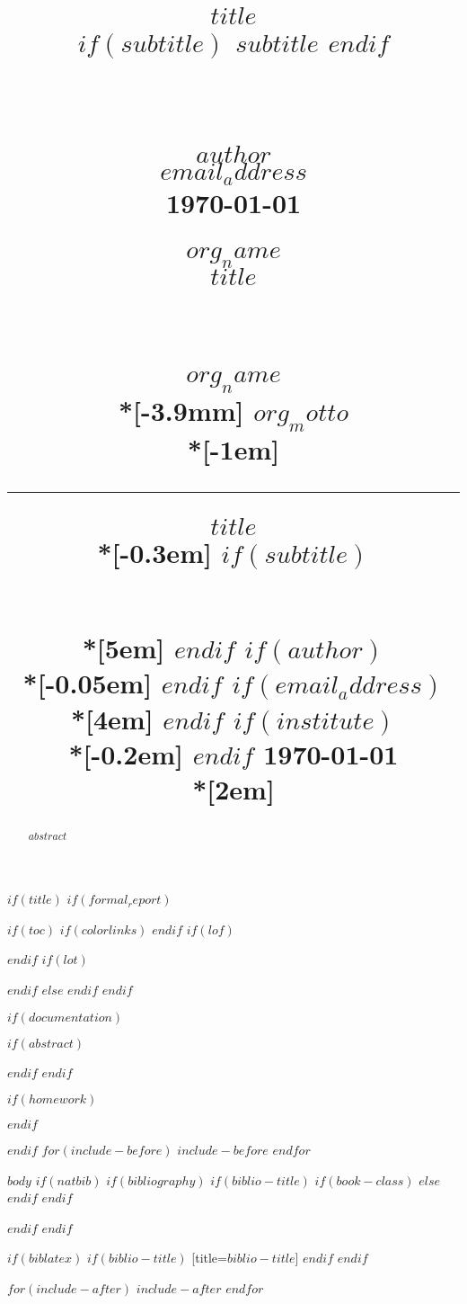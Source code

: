 \documentclass[$if(fontsize)$$fontsize$,$endif$$if(lang)$$babel-lang$,$endif$$if(papersize)$$papersize$paper,$endif$$for(classoption)$$classoption$$sep$,$endfor$]{$documentclass$}
\title{
    \normalsize
    \begin{flushright}
        \vspace{-7mm}
        \fontsize{22pt}{22pt} \color{black} \textbf{$title$} \\
        \vspace{0.3em}
        $if(subtitle)$
        \fontsize{20pt}{20pt}\color{$subtlecolor$} \textbf{$subtitle$}
        $endif$
        \vspace{-0.5em}
    \end{flushright}
    \horrule{0.4pt} \\[-0.5em]
}
\date{\vspace{-8mm}}
\title{
    \normalsize
    \begin{flushright}
        \vspace{-3em}
        \large \textbf{\textsf{$author$}} \\
        \vspace{-0.03em}
        \normalsize \textbf{\textsf{\color{$maincolor$}$email_address$}} \\
        \vspace{-0.05em}
        \textsf{\today} \\
        \vspace{1.15em}
    \end{flushright}
    \vspace{-6.0em}
    \begin{flushleft}
        \Huge \textbf{\textsf{\color{$maincolor$}$org_name$} }\\ %
        \vspace{0.07em}
        \Large \textbf{\textsf{\color{$if(grayscale)$$othercolorbw$$else$$othercolor$$endif$}$title$}} \\
        \vspace{-0.3em}
    \end{flushleft}
    \horrule{0.2pt} \\[0.5em] %
}
\date{\vspace{-4em}}
\title{
    \begin{flushright}
        \sffamily
        \vspace*{0em}
        \noindent
        \hspace{-0.40em}\YUGE 	\bfseries	\color{$if(grayscale)$$othercolorbw$$else$$othercolor$$endif$} \textbf{$org_name$} \\*[-3.9mm]
        \Yuge 		\color{black} \textbf{$org_motto$}   \\*[-1em]
        \color{black}		\hrule 		 	\vspace   	{10em}
    \end{flushright}
    \begin{flushleft}
        \sffamily
        \Subtitle  	\color{$maincolor$} \textbf{$title$}		\\*[-0.3em]
        $if(subtitle)$
        \hspace{-0.65em} \subtitle	\color{$if(grayscale)$$othercolorbw$$else$$othercolor$$endif$} \text{ $subtitle$} 	\\*[5em]
        $endif$
        $if(author)$
        \Huge	\color{black} \text{$author$}		\\*[-0.05em]
        $endif$
        $if(email_address)$
        \LARGE	\color{$if(grayscale)$$othercolorbw$$else$$othercolor$$endif$} \text{$email_address$}	\\*[4em]
        $endif$
        $if(institute)$
        \Large	\color{black}	\text{$institute$} 	\\*[-0.2em]
        $endif$
        \Large		\color{$if(grayscale)$$othercolorbw$$else$$othercolor$$endif$}			\today				\\*[2em]
    \end{flushleft}
    }
\date{\vspace{1mm}}
\begin{document}
$if(title)$
$if(formal_report)$
\thispagestyle{title}
\maketitle
{} \vspace{-20mm}
$if(toc)$	{
$if(colorlinks)$
\hypersetup{linkcolor=$if(toccolor)$$toccolor$$else$black$endif$}
$endif$
\setcounter{tocdepth}{$toc-depth$}
\tableofcontents \vspace{15mm}
}
\thispagestyle{plain}
$if(lof)$
\listoffigures
$endif$
$if(lot)$
\listoftables	\vspace{5mm}
$endif$
\cleardoublepage
{}
\newpage
$else$
\thispagestyle{plain}
$endif$
$endif$

$if(documentation)$
\maketitle
$if(abstract)$
\begin{abstract}
$abstract$
\end{abstract}
$endif$
$endif$

$if(homework)$
\maketitle \vspace{3mm}
$endif$

$endif$
$for(include-before)$
$include-before$
$endfor$

$body$
$if(natbib)$
$if(bibliography)$
$if(biblio-title)$
$if(book-class)$
\renewcommand\bibname{$biblio-title$}
$else$
\renewcommand\refname{$biblio-title$}
$endif$
$endif$

$endif$
$endif$

$if(biblatex)$
\printbibliography
$if(biblio-title)$
[title=$biblio-title$]
$endif$
$endif$

$for(include-after)$
$include-after$
$endfor$
\end{document}
